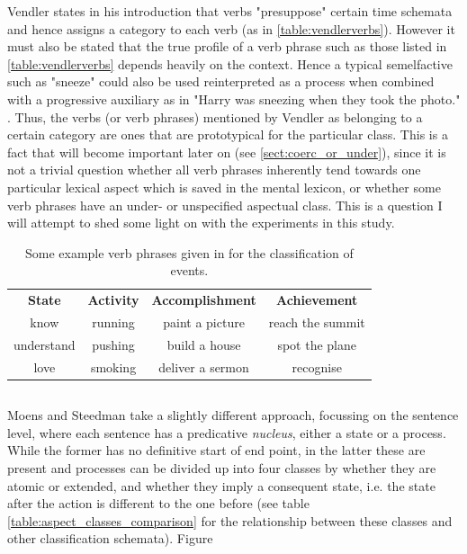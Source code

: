Vendler states in his introduction that verbs "presuppose" certain time schemata and hence assigns a category to each verb (as in \ref{table:vendlerverbs}). However it must also be stated that the true profile of a verb phrase such as those listed in \ref{table:vendlerverbs} depends heavily on the context. Hence a typical semelfactive such as "sneeze" could also be used reinterpreted as a process when combined with a progressive auxiliary as in "Harry was sneezing when they took the photo." \citep{moens-steedman-1988-temporal}. Thus, the verbs (or verb phrases) mentioned by Vendler as belonging to a certain category are ones that are prototypical for the particular class. This is a fact that will become important later on (see \ref{sect:coerc_or_under}), since it is not a trivial question whether all verb phrases inherently tend towards one particular lexical aspect which is saved in the mental lexicon, or whether some verb phrases have an under- or unspecified aspectual class. This is a question I will attempt to shed some light on with the experiments in this study.

\begin{table}
    \centering
    \begin{tabular}{|c|c|c|c|}
        
        \textbf{State} & \textbf{Activity} & \textbf{Accomplishment} & \textbf{Achievement} \\
        know & running & paint a picture & reach the summit \\
        understand & pushing & build a house & spot the plane \\
        love & smoking & deliver a sermon & recognise
    \end{tabular}
    \caption{Some example verb phrases given in \citet{vendler57} for the classification of events.}
\end{table}
\label{table:vendlerverbs}

\subsection*{\citet{moens-steedman-1988-temporal}}
Moens and Steedman take a slightly different approach, focussing on the sentence level, where each sentence has a predicative \emph{nucleus}, either a state or a process. While the former has no definitive start of end point, in the latter these are present and processes can be divided up into four classes by whether they are atomic or extended, and whether they imply a consequent state, i.e. the state after the action is different to the one before (see table \ref{table:aspect_classes_comparison} for the relationship between these classes and other classification schemata). Figure 

